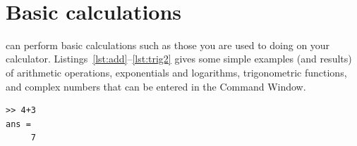 \addtolength{\parindent}{-4mm}
\\
\addtolength{\parindent}{4mm}

\section{Basic calculations}
\mlab can perform basic calculations such as those you are used to doing on your calculator. Listings~\ref{lst:add}--\ref{lst:trig2} gives some simple examples (and results) of arithmetic operations, exponentials and logarithms, trigonometric functions, and complex numbers that can be entered in the Command Window.
\begin{lstlisting}[caption={Addition},label=lst:add]
>> 4+3
ans = 
	 7
\end{lstlisting}	 

